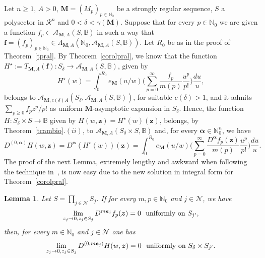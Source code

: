 \documentclass[11pt,a4paper,leqno]{article}
\theoremstyle{plain}
\newtheorem{lemma}[theo]{Lemma}
\theoremstyle{definition}
\def\N{\mathbb{N}}
\def\balpha{\boldsymbol{\alpha}}
\def\be{\boldsymbol{e}}
\def\bfe{\boldsymbol{f}}
\def\bM{\boldsymbol{M}}
\def\bz{\boldsymbol{z}}
\begin{document}
Let $n\ge 1$, $A>0$, $\bM=(M_{p})_{p\in\N_0}$ be a strongly regular sequence,
$S$ a polysector in $\mathcal{R}^n$ and $0<\delta<\gamma(\bM)$. Suppose that for every $p\in\N_{0}$ we are given a function $f_{p}\in\mathcal{A}_{\bM,A}(S,\mathbb{B})$ in such a way that $\bfe=(f_{p})_{p\in\N_0}\in\Lambda_{\bM,A}\left(\N_0,\mathcal{A}_{\bM,A}(S,\mathbb{B})\right)$. Let $R_0$ be as in the proof of Theorem~\ref{tpral}. By Theorem~\ref{corolpral}, we know that the function $H^{\star}:=T_{\bM,A}(\bfe):S_{\delta}\to\mathcal{A}_{\bM,A}(S,\mathbb{B})$, given by
$$H^{\star}(w)=\int_{0}^{R_0}e_{\bM}(u/w) \Big(\sum_{p=0}^{\infty}\frac{f_{p}}{m(p)}\frac{u^{p}}{p!}\Big)\frac{du}{u},$$
belongs to $\mathcal{A}_{\bM,c(\delta)A}(S_{\delta},\mathcal{A}_{\bM,A}(S,\mathbb{B}))$, for suitable $c(\delta)>1$, and it admits $\sum_{p\ge0}f_{p}z^p/p!$ as uniform $\bM$-asymptotic expansion in $S_{\delta}$. Hence, the function $H:S_{\delta}\times S\to\mathbb{B}$ given by $H(w,\bz)=H^{\star}(w)(\bz)$, belongs, by Theorem~\ref{tcambio}$.(ii)$, to $\mathcal{A}_{\bM,A}(S_{\delta}\times S,\mathbb{B})$ and, for every $\balpha\in\N_{0}^{n}$, we have
\begin{equation}
D^{(0,\balpha)}H(w,\bz)=D^{\balpha}(H^{\star}(w))(\bz)
=\int_{0}^{R_0}e_{\bM}(u/w) \Big(\sum_{p=0}^{\infty}\frac{D^{\balpha}f_{p}(\bz)}{m(p)}\frac{u^{p}}{p!}\Big)\frac{du}{u}.
\label{e473}
\end{equation}
The proof of the next Lemma, extremely lengthy and awkward when following the technique in~\cite{thilliez}, is now easy due to the new solution in integral form for Theorem~\ref{corolpral}.
\begin{lemma}\label{lemaDerivNula}
Let $S=\prod_{j\in\mathcal{N}}S_j$. If for every $m,p\in\N_0$ and $j\in\mathcal{N}$, we have
\begin{equation}\label{e480}
\lim_{z_{j}\to0,z_{j}\in S_{j}}D^{m\be_{j}}f_{p}(\bz)=0\hbox{ \ uniformly on }S_{j'},
\end{equation}
then, for every $m\in\N_0$ and $j\in\mathcal{N}$ one has
$$\lim_{z_{j}\to0,z_{j}\in S_{j}}D^{(0,m\be_{j})}H(w,\bz)=0\hbox{ \ uniformly on }S_{\delta}\times S_{j'}.
$$
\end{lemma}
\end{document}
